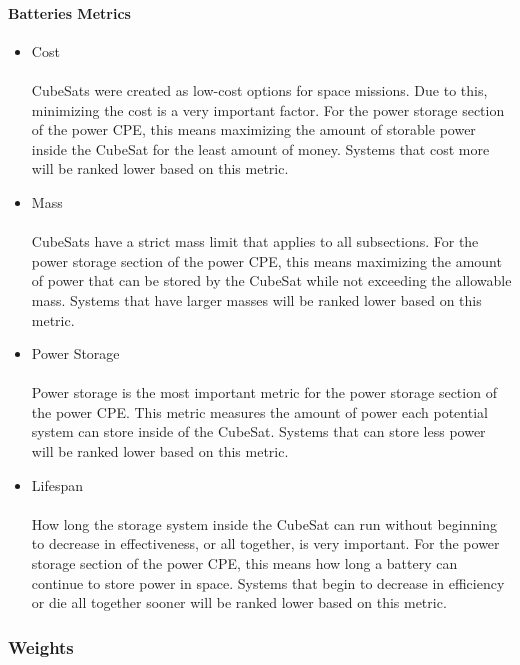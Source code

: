 \documentclass{ece}
\begin{document}
\paragraph{Batteries Metrics}
\begin{itemize}
\item Cost\\
\\
CubeSats were created as low-cost options for space missions.  Due to this, minimizing the cost is a very important factor.  For the power storage section of the power CPE,  this means maximizing the amount of storable power inside the CubeSat for the least amount of money.  Systems that cost more will be ranked lower based on this metric.
\item{Mass} \\
\\
CubeSats have a strict mass limit that applies to all subsections.  For the power storage section of the power CPE, this means maximizing the amount of power that can be stored by the CubeSat while not exceeding the allowable mass.  Systems that have larger masses will be ranked lower based on this metric.
\item{Power Storage} \\
\\
Power storage is the most important metric for the power storage section of the power CPE.  This metric measures the amount of power each potential system can store inside of the CubeSat.  Systems that can store less power will be ranked lower based on this metric.
\item{Lifespan} \\
\\
How long the storage system inside the CubeSat can run without beginning to decrease in effectiveness, or all together, is very important.  For the power storage section of the power CPE, this means how long a battery can continue to store power in space.  Systems that begin to decrease in efficiency or die all together sooner will be ranked lower based on this metric.
\end{itemize}
\subsubsection{Weights}
\end{document}
